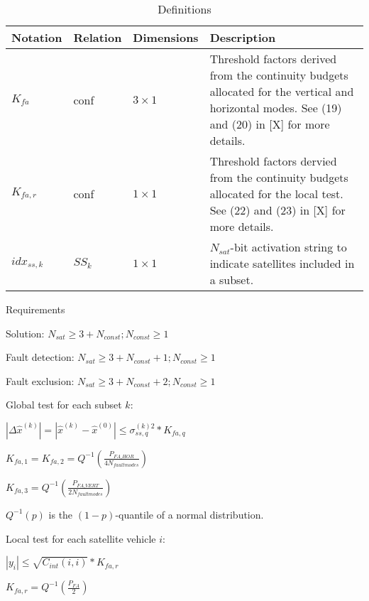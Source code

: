 \documentclass[11pt]{article}
\begin{document}
\begin{table}[htbp] \centering
  \caption{Definitions}
  \begin{tabular}{|m{2cm}|m{2cm}|m{2cm}|m{7cm}|}
    \hline
    \textbf{Notation} & \textbf{Relation} & \textbf{Dimensions} & \textbf{Description}\\ \hline
    $K_{fa}$ & conf & $3 \times 1$ & Threshold factors derived from the continuity budgets allocated for the vertical and horizontal modes. See (19) and (20) in [X] for more details.\\ \hline
    $K_{fa,r}$ & conf & $1 \times 1$ & Threshold factors dervied from the continuity budgets allocated for the local test. See (22) and (23) in [X] for more details.\\ \hline
    $idx_{ss,k}$ & $SS_k$ & $1 \times 1$ & $N_{sat}$-bit activation string to indicate satellites included in a subset.\\ \hline
  \end{tabular}
\end{table}

Requirements

Solution: $N_{sat} \ge 3 + N_{const}; N_{const} \ge 1$

Fault detection: $N_{sat} \ge 3 + N_{const} + 1; N_{const} \ge 1$

Fault exclusion: $N_{sat} \ge 3 + N_{const} + 2; N_{const} \ge 1$

Global test for each subset $k$:

$|\Delta \hat{x}^{(k)}| = |\hat{x}^{(k)} - \hat{x}^{(0)}| \le \sigma_{ss,q}^{(k)2} * K_{fa,q}$

$K_{fa,1} = K_{fa,2} = Q^{-1}(\frac{P_{FA\_HOR}}{4N_{fault modes}})$

$K_{fa,3} = Q^{-1}(\frac{P_{FA\_VERT}}{2N_{fault modes}})$

$Q^{-1}(p)$ is the $(1-p)$-quantile of a normal distribution.

Local test for each satellite vehicle $i$:

$|y_i| \le \sqrt{C_{int}(i,i)} * K_{fa,r}$

$K_{fa,r} = Q^{-1}(\frac{P_{FA}}{2})$
\end{document}
